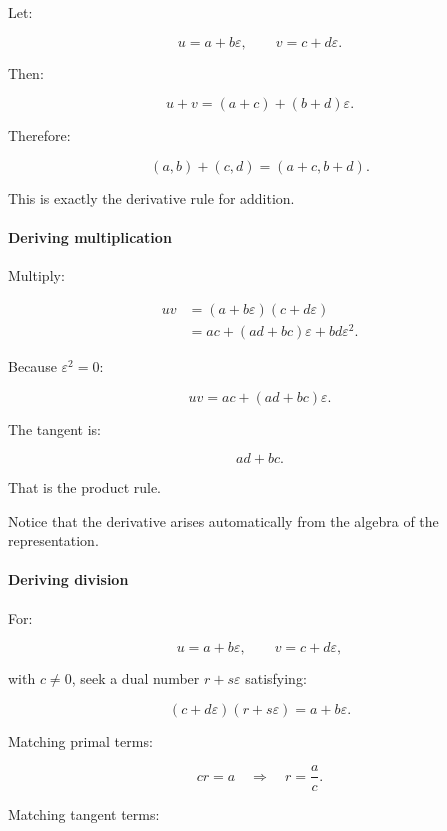 Let:

\[
u=a+b\varepsilon, \qquad v=c+d\varepsilon.
\]

Then:

\[
u+v=(a+c)+(b+d)\varepsilon.
\]

Therefore:

\[
\boxed{ (a,b)+(c,d)=(a+c,b+d) }.
\]

This is exactly the derivative rule for addition.

\paragraph{Deriving multiplication}\label{02-foundations-ii-ch022-deriving-multiplication}

\hypertarget{02-foundations-ii-ch022-deriving-multiplication}{}

Multiply:

\[
\begin{aligned} uv &=(a+b\varepsilon)(c+d\varepsilon)\\ &=ac+(ad+bc)\varepsilon+bd\varepsilon^2. \end{aligned}
\]

Because \(\varepsilon^2=0\):

\[
\boxed{ uv=ac+(ad+bc)\varepsilon }.
\]

The tangent is:

\[
ad+bc.
\]

That is the product rule.

Notice that the derivative arises automatically from the algebra of the representation.

\paragraph{Deriving division}\label{02-foundations-ii-ch022-deriving-division}

\hypertarget{02-foundations-ii-ch022-deriving-division}{}

For:

\[
u=a+b\varepsilon,\qquad v=c+d\varepsilon,
\]

with \(c\ne0\), seek a dual number \(r+s\varepsilon\) satisfying:

\[
(c+d\varepsilon)(r+s\varepsilon) = a+b\varepsilon.
\]

Matching primal terms:

\[
cr=a \quad\Longrightarrow\quad r=\frac ac.
\]

Matching tangent terms:

